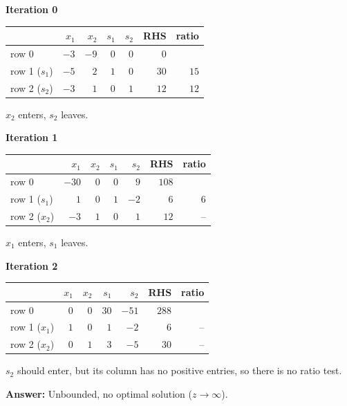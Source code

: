 \documentclass{article}
\begin{document}
\textbf{Iteration 0}

\begin{center}
\begin{tabular}{lrrrrrr}
\toprule
 & $x_1$ & $x_2$ & $s_1$ & $s_2$ & RHS & ratio \\
\midrule
row 0 & $-3$ & $-9$ & $0$ & $0$ & $0$ &  \\
row 1 ($s_1$) & $-5$ & $2$ & $1$ & $0$ & $30$ & $15$ \\
row 2 ($s_2$) & $-3$ & $\boxed{1}$ & $0$ & $1$ & $12$ & $12$ \\
\bottomrule
\end{tabular}
\end{center}

$x_2$ enters, $s_2$ leaves.

\textbf{Iteration 1}

\begin{center}
\begin{tabular}{lrrrrrr}
\toprule
 & $x_1$ & $x_2$ & $s_1$ & $s_2$ & RHS & ratio \\
\midrule
row 0 & $-30$ & $0$ & $0$ & $9$ & $108$ &  \\
row 1 ($s_1$) & $\boxed{1}$ & $0$ & $1$ & $-2$ & $6$ & $6$ \\
row 2 ($x_2$) & $-3$ & $1$ & $0$ & $1$ & $12$ & -- \\
\bottomrule
\end{tabular}
\end{center}

$x_1$ enters, $s_1$ leaves.

\textbf{Iteration 2}

\begin{center}
\begin{tabular}{lrrrrrr}
\toprule
 & $x_1$ & $x_2$ & $s_1$ & $s_2$ & RHS & ratio \\
\midrule
row 0 & $0$ & $0$ & $30$ & $-51$ & $288$ &  \\
row 1 ($x_1$) & $1$ & $0$ & $1$ & $-2$ & $6$ & -- \\
row 2 ($x_2$) & $0$ & $1$ & $3$ & $-5$ & $30$ & -- \\
\bottomrule
\end{tabular}
\end{center}

$s_2$ should enter, but its column has no positive entries, so there is no ratio test.

\textbf{Answer:} Unbounded, no optimal solution ($z \to \infty$).
\end{document}
